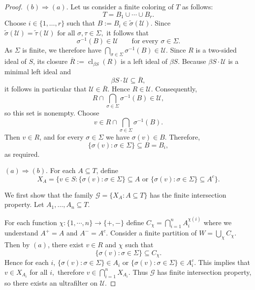 \documentclass[12pt]{amsart}
\begin{document}
\begin{proof}
$(b)\Rightarrow (a)$. Let us consider a finite coloring of $T$ as follows:
\[
T=B_1\cup\cdots\cup B_r.
\]
 Choose $i\in\{1,\dots,r\}$ such that
$B:=B_i\in \widetilde{\sigma}(\mathcal U).$ Since $\widetilde{\sigma}(\mathcal U)=\widetilde{\tau}(\mathcal U)
\mbox{ for all }\sigma,\tau\in\Sigma,$ it follows that
\[
\sigma^{-1}(B)\in\mathcal U
\qquad\text{for every }\sigma\in\Sigma.
\]
As $\Sigma$ is finite, we therefore have $\bigcap_{\sigma\in\Sigma}\sigma^{-1}(B)\in\mathcal U.$ Since $R$ is a two-sided ideal of $S$, its closure $\overline{R}:=\operatorname{cl}_{\beta S}(R)$ is a left ideal of $\beta S$. Because $\beta S\cdot\mathcal U$ is a minimal left ideal and
\[
\beta S\cdot\mathcal U\subseteq \overline{R},
\]
it follows in particular that $\mathcal U\in\overline{R}.$ Hence $R\in\mathcal U$. Consequently,
\[
R\cap\bigcap_{\sigma\in\Sigma}\sigma^{-1}(B)\in\mathcal U,
\]
so this set is nonempty. Choose
\[
v\in R\cap\bigcap_{\sigma\in\Sigma}\sigma^{-1}(B).
\]
Then $v\in R$, and for every $\sigma\in\Sigma$ we have $\sigma(v)\in B$. Therefore,
\[
\{\sigma(v):\sigma\in\Sigma\}\subseteq B=B_i,
\]
as required.

$ (a) \Rightarrow (b)$. For each $A \subseteq T$, define
\[
X_A = \{v \in S : \{\sigma(v): \sigma \in \Sigma\} \subseteq A \text{ or }  \{\sigma(v): \sigma \in \Sigma\} \subseteq A^c\}.
\]

We first show that the family $\mathcal{G}=\{X_A: A \subseteq T\}$ has the finite intersection property. Let $A_1,\dots,A_n \subseteq T$. 


For each function $\chi : \{1, \cdots ,n\} \rightarrow \{+,-\}$ define $C_{\chi} = \bigcap_{i=1}^n A_i^{\chi(i)}$  where we understand $A^+=A$ and $A^{-}=A^c.$ Consider a finite partition of  $W= \bigcup_{\chi}C_{\chi}$. Then by $(a)$, there exist $v \in R$ and $\chi$ such that $$\{\sigma(v) : \sigma \in \Sigma\} \subseteq C_{\chi}.$$ Hence for each $i$, $\{\sigma(v) : \sigma \in \Sigma\} \in A_i$ or $\{\sigma(v) : \sigma \in \Sigma\} \in A_i^c$. This implies that $v \in X_{A_i}$ for all $i,$ therefore $v \in \bigcap_{i=1}^nX_{A_i}.$ Thus $\mathcal{G}$ has finite intersection property, so there exists an ultrafilter on $\mathcal{U}$.


\end{proof}
\end{document}
